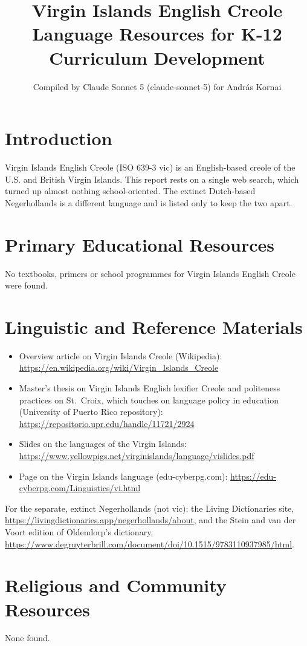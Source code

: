 \documentclass[12pt]{article}
\title{Virgin Islands English Creole Language Resources for K-12 Curriculum Development}
\author{Compiled by Claude Sonnet 5 (claude-sonnet-5) for Andr\'as Kornai}
\date{}
\begin{document}
\maketitle

\section{Introduction}
Virgin Islands English Creole (ISO 639-3 vic) is an English-based creole of the U.S. and British Virgin Islands. This report rests on a single web search, which turned up almost nothing school-oriented. The extinct Dutch-based Negerhollands is a different language and is listed only to keep the two apart.

\section{Primary Educational Resources}
No textbooks, primers or school programmes for Virgin Islands English Creole were found.

\section{Linguistic and Reference Materials}
\begin{itemize}
\item Overview article on Virgin Islands Creole (Wikipedia): \url{https://en.wikipedia.org/wiki/Virgin_Islands_Creole}
\item Master's thesis on Virgin Islands English lexifier Creole and politeness practices on St.\ Croix, which touches on language policy in education (University of Puerto Rico repository): \url{https://repositorio.upr.edu/handle/11721/2924}
\item Slides on the languages of the Virgin Islands: \url{https://www.yellowpigs.net/virginislands/language/vislides.pdf}
\item Page on the Virgin Islands language (edu-cyberpg.com): \url{https://edu-cyberpg.com/Linguistics/vi.html}
\end{itemize}
For the separate, extinct Negerhollands (not vic): the Living Dictionaries site, \url{https://livingdictionaries.app/negerhollands/about}, and the Stein and van der Voort edition of Oldendorp's dictionary, \url{https://www.degruyterbrill.com/document/doi/10.1515/9783110937985/html}.

\section{Religious and Community Resources}
None found.
\end{document}
